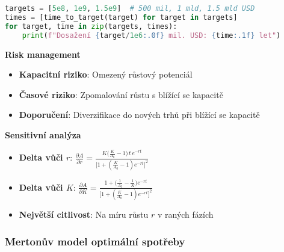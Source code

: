 \begin{example}
\begin{lstlisting}[language=Python, caption={Implementace logistického růstu v Pythonu}, label={lst:logistic-growth}]
targets = [5e8, 1e9, 1.5e9]  # 500 mil, 1 mld, 1.5 mld USD
times = [time_to_target(target) for target in targets]
for target, time in zip(targets, times):
    print(f"Dosažení {target/1e6:.0f} mil. USD: {time:.1f} let")
\end{lstlisting}

\noindent\textbf{Risk management}
\begin{itemize}
\item \textbf{Kapacitní riziko}: Omezený růstový potenciál
\item \textbf{Časové riziko}: Zpomalování růstu s blížící se kapacitě
\item \textbf{Doporučení}: Diverzifikace do nových trhů při blížící se kapacitě
\end{itemize}

\noindent\textbf{Sensitivní analýza}
\begin{itemize}
\item \textbf{Delta vůči $r$}: $\displaystyle \frac{\partial A}{\partial r} = \frac{K\bigl(\frac{K}{A_0} - 1\bigr)\, t\, e^{-rt}}{\bigl[1 + (\frac{K}{A_0} - 1)e^{-rt}\bigr]^2}$
\item \textbf{Delta vůči $K$}: $\displaystyle \frac{\partial A}{\partial K} = \frac{1 + \bigl(\frac{1}{A_0} - \frac{1}{K}\bigr)e^{-rt}}{\bigl[1 + (\frac{K}{A_0} - 1)e^{-rt}\bigr]^2}$
\item \textbf{Největší citlivost}: Na míru růstu $r$ v raných fázích
\end{itemize}
\end{example}

\subsubsection{Mertonův model optimální spotřeby}
\label{subsec:merton-model}

